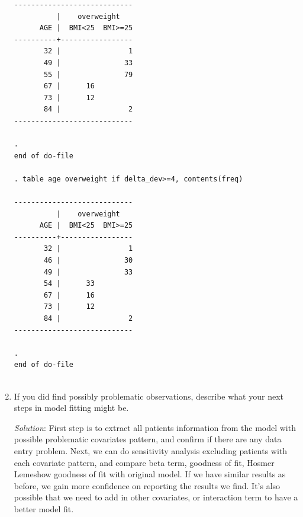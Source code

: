 \documentclass{article}
\begin{document}
\begin{enumerate}
\begin{verbatim}
----------------------------
          |    overweight   
      AGE |  BMI<25  BMI>=25
----------+-----------------
       32 |                1
       49 |               33
       55 |               79
       67 |      16         
       73 |      12         
       84 |                2
----------------------------

. 
end of do-file

. table age overweight if delta_dev>=4, contents(freq)

----------------------------
          |    overweight   
      AGE |  BMI<25  BMI>=25
----------+-----------------
       32 |                1
       46 |               30
       49 |               33
       54 |      33         
       67 |      16         
       73 |      12         
       84 |                2
----------------------------

. 
end of do-file


    \end{verbatim}
      
      
      \item If you did find possibly problematic observations, describe what your next steps in model fitting might be.
      
      \textit{Solution}: First step is to extract all patients information from the model with possible problematic covariates pattern, and confirm if there are any data entry problem. Next, we can do sensitivity analysis excluding patients with each covariate pattern, and compare beta term, goodness of fit, Hosmer Lemeshow goodness of fit with original model. If we have similar results as before, we gain more confidence on reporting the results we find. It's also possible that we need to add in other covariates, or interaction term to have a better model fit.
      
  \end{enumerate}
\end{document}

